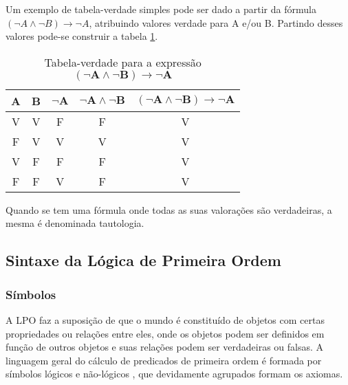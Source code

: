 Um exemplo de tabela-verdade simples pode ser dado a partir da fórmula $(\neg A \land \neg B) \rightarrow \neg A $, atribuindo valores verdade para A e/ou B. Partindo desses valores pode-se construir a tabela \ref{tab:tva}.

\begin{table}[!htb]
\centering
\caption[Tabela-verdade para a expressão $\mathbf{(\neg A \land \neg B) \rightarrow \neg A }$]{Tabela-verdade para a expressão $\mathbf{(\neg A \land \neg B) \rightarrow \neg A }$}
\label{tab:tva}
\begin{tabular}{c|c|c|c|c}
\hline
\textbf{A} & \textbf{B} & $\mathbf{\neg A}$ & $\mathbf{\neg A \land \neg B}$ & $\mathbf{(\neg A \land \neg B) \rightarrow \neg A}$ \\ \hline
V          & V          & F          & F          & V          \\ \hline
F          & V          & V          & V          & V          \\ \hline
V          & F          & F          & F          & V          \\ \hline
F          & F          & V          & F          & V          \\ \hline
\end{tabular}
\end{table}

Quando se tem uma fórmula onde todas as suas valorações são verdadeiras, a mesma é denominada tautologia.

\subsection{Sintaxe da Lógica de Primeira Ordem}

\subsubsection{Símbolos}

A LPO faz a suposição de que o mundo é constituído de objetos com certas propriedades ou relações entre eles, onde os objetos podem ser definidos em função de outros objetos e suas relações podem ser verdadeiras ou falsas. A linguagem geral do cálculo de predicados de primeira ordem é formada por símbolos lógicos e não-lógicos \cite{mortari2001}, que devidamente agrupados formam os axiomas. 

